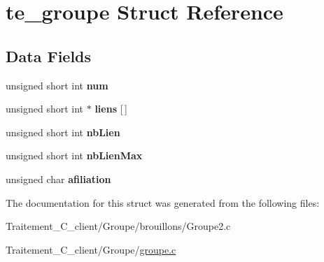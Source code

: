 \hypertarget{structte__groupe}{}\section{te\+\_\+groupe Struct Reference}
\label{structte__groupe}
\subsection*{Data Fields}
\begin{DoxyCompactItemize}
\item 
unsigned short int {\bfseries num}\hypertarget{structte__groupe_a3ccc5ebed157bcf739817f42bc13807d}{}\label{structte__groupe_a3ccc5ebed157bcf739817f42bc13807d}

\item 
unsigned short int $\ast$ {\bfseries liens} \mbox{[}$\,$\mbox{]}\hypertarget{structte__groupe_adc9b79673d29670871f07a0181bf4a7c}{}\label{structte__groupe_adc9b79673d29670871f07a0181bf4a7c}

\item 
unsigned short int {\bfseries nb\+Lien}\hypertarget{structte__groupe_a012eab139ace11552d9835cfd98c3ddd}{}\label{structte__groupe_a012eab139ace11552d9835cfd98c3ddd}

\item 
unsigned short int {\bfseries nb\+Lien\+Max}\hypertarget{structte__groupe_a411f7b0dd9be935da9a3d882d7b0e087}{}\label{structte__groupe_a411f7b0dd9be935da9a3d882d7b0e087}

\item 
unsigned char {\bfseries afiliation}\hypertarget{structte__groupe_af29b1c1561e330ebaa092075ddf2a613}{}\label{structte__groupe_af29b1c1561e330ebaa092075ddf2a613}

\end{DoxyCompactItemize}


The documentation for this struct was generated from the following files\+:\begin{DoxyCompactItemize}
\item 
Traitement\+\_\+\+C\+\_\+client/\+Groupe/brouillons/Groupe2.\+c\item 
Traitement\+\_\+\+C\+\_\+client/\+Groupe/\hyperlink{groupe_8c}{groupe.\+c}\end{DoxyCompactItemize}
